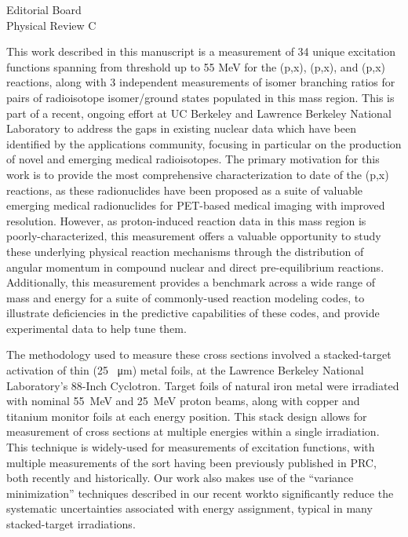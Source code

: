 \documentclass{letter} %
\begin{document}
\begin{letter}{
Editorial Board \\
Physical Review C}
 
\noindent This work described in this manuscript is a measurement of 34 unique excitation functions spanning  from threshold up to 55 MeV for the (p,x), (p,x), and (p,x) reactions, along with 3 independent measurements of isomer branching ratios for pairs of radioisotope isomer/ground states populated in this mass region. This is part of a recent, ongoing effort at UC Berkeley and Lawrence Berkeley National Laboratory to address the gaps in existing nuclear data which have been identified by the applications community, focusing in particular on the production of novel and emerging medical radioisotopes. The primary motivation for this work is to provide the most comprehensive characterization to date of the (p,x) reactions, as these radionuclides have been proposed as a suite of valuable emerging medical radionuclides for PET-based medical imaging with improved resolution.  However, as proton-induced reaction data in this mass region is poorly-characterized, this measurement offers a valuable opportunity to study these underlying physical reaction mechanisms through the distribution of angular momentum in compound nuclear and direct pre-equilibrium reactions. Additionally, this measurement provides a benchmark across a wide range of mass and energy for a suite of commonly-used reaction modeling codes, to illustrate deficiencies in the predictive capabilities of these codes, and provide experimental data to help tune them. 



\noindent The methodology used to measure these cross sections involved a stacked-target activation of thin (25 \SI{}{\micro\meter}) metal foils,  at the Lawrence Berkeley National Laboratory's 88-Inch Cyclotron. Target foils of natural iron metal were irradiated with nominal 55~MeV and 25~MeV proton beams, along with copper and titanium monitor foils at each energy position.   This stack design allows for measurement of cross sections at multiple energies within a single irradiation. This technique is widely-used for measurements of excitation functions, with multiple measurements of the sort having been previously published in PRC, both recently and historically\footnotemark[5]\footnotemark[6]\footnotemark[7]\footnotemark[8]. 
Our work also makes use of the ``variance minimization'' techniques described in our recent work\footnotemark[10] to significantly reduce the systematic uncertainties associated with energy assignment, typical in many stacked-target irradiations.



\end{letter}
\end{document}
